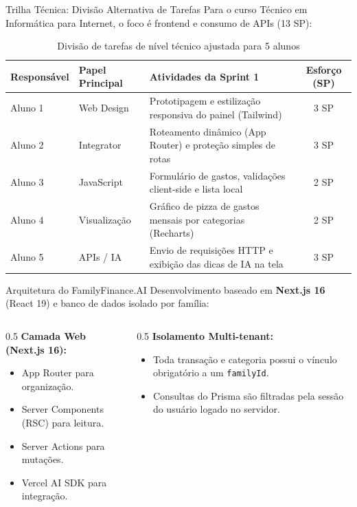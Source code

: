 \documentclass[10pt]{beamer}
\begin{document}
\begin{frame}{Trilha Técnica: Divisão Alternativa de Tarefas}
    Para o curso Técnico em Informática para Internet, o foco é frontend e consumo de APIs (13 SP):
    \begin{table}[]
        \tiny
        \centering
        \begin{tabular}{lllc}
            \toprule
            \textbf{Responsável} & \textbf{Papel Principal} & \textbf{Atividades da Sprint 1} & \textbf{Esforço (SP)} \\
            \midrule
            Aluno 1 & Web Design & Prototipagem e estilização responsiva do painel (Tailwind) & 3 SP \\
            Aluno 2 & Integrator & Roteamento dinâmico (App Router) e proteção simples de rotas & 3 SP \\
            Aluno 3 & JavaScript & Formulário de gastos, validações client-side e lista local & 2 SP \\
            Aluno 4 & Visualização & Gráfico de pizza de gastos mensais por categorias (Recharts) & 2 SP \\
            Aluno 5 & APIs / IA & Envio de requisições HTTP e exibição das dicas de IA na tela & 3 SP \\
            \bottomrule
        \end{tabular}
        \caption{Divisão de tarefas de nível técnico ajustada para 5 alunos}
    \end{table}
\end{frame}

\begin{frame}{Arquitetura do FamilyFinance.AI}
    Desenvolvimento baseado em \textbf{Next.js 16} (React 19) e banco de dados isolado por família:
    \begin{columns}
        \begin{column}{0.5\textwidth}
            \textbf{Camada Web (Next.js 16):}
            \begin{itemize}
                \item App Router para organização.
                \item Server Components (RSC) para leitura.
                \item Server Actions para mutações.
                \item Vercel AI SDK para integração.
            \end{itemize}
        \end{column}
        \begin{column}{0.5\textwidth}
            \textbf{Isolamento Multi-tenant:}
            \begin{itemize}
                \item Toda transação e categoria possui o vínculo obrigatório a um \texttt{familyId}.
                \item Consultas do Prisma são filtradas pela sessão do usuário logado no servidor.
            \end{itemize}
        \end{column}
    \end{columns}
\end{frame}
\end{document}
